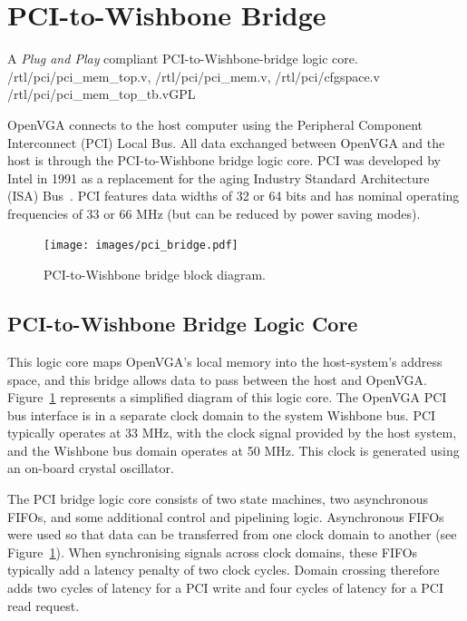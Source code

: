 \section{PCI-to-Wishbone Bridge}
\label{PCI}

{A \textit{Plug and Play} compliant PCI-to-Wishbone-bridge logic core.}
{/rtl/pci/pci\_mem\_top.v, /rtl/pci/pci\_mem.v, /rtl/pci/cfgspace.v}
{/rtl/pci/pci\_mem\_top\_tb.v}{GPL}

OpenVGA connects to the host computer using the Peripheral Component Interconnect
(PCI) Local Bus. All data exchanged between OpenVGA and the host is through the
PCI-to-Wishbone bridge logic core. PCI was developed by Intel in 1991 as a
replacement for the aging Industry Standard Architecture (ISA)
Bus~\cite{PCI_Book, PCI_Spec}. PCI features data widths of 32 or 64 bits and has
nominal operating frequencies of 33 or 66 MHz (but can be reduced by power saving
modes).

\begin{figure}[h!]
\begin{center}
\texttt{[image: images/pci\_bridge.pdf]}
\end{center}
\caption[PCI-to-Wishbone bridge block diagram]{PCI-to-Wishbone bridge block
diagram.}
\label{PCI_Block_Diagram}
\end{figure}


\subsection{PCI-to-Wishbone Bridge Logic Core}
This logic core maps OpenVGA's local memory into the host-system's address space,
and this bridge allows data to pass between the host and OpenVGA.
Figure~\ref{PCI_Block_Diagram} represents a simplified diagram of this logic
core. The OpenVGA PCI bus interface is in a separate clock domain to the system
Wishbone bus. PCI typically operates at 33 MHz, with the clock signal provided by
the host system, and the Wishbone bus domain operates at 50 MHz. This clock is
generated using an on-board crystal oscillator.

The PCI bridge logic core consists of two state machines, two asynchronous FIFOs,
and some additional control and pipelining logic. Asynchronous FIFOs were used so
that data can be transferred from one clock domain to another (see
Figure~\ref{PCI_Block_Diagram}). When synchronising signals across clock domains,
these FIFOs typically add a latency penalty of two clock cycles. Domain crossing
therefore adds two cycles of latency for a PCI write and four cycles of latency
for a PCI read request.


